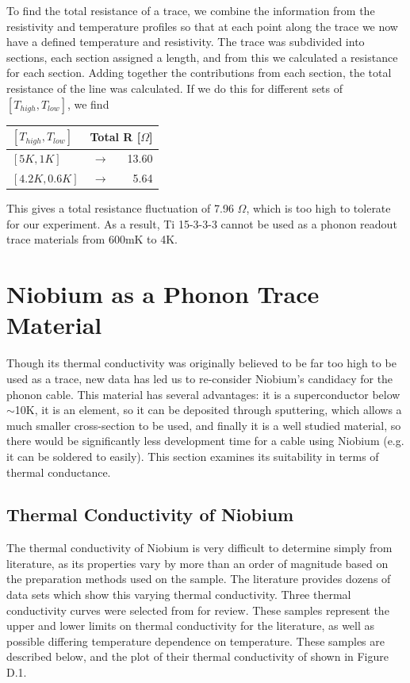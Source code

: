 \documentclass{report}
\begin{document}
\begin{appendices}
To find the total resistance of a trace, we combine the information from the resistivity and temperature profiles so that at each point along the trace we now have a defined temperature and resistivity. The trace was subdivided into sections, each section assigned a length, and from this we calculated a resistance for each section. Adding together the contributions from each section, the total resistance of the line was calculated. If we do this for different sets of $[T_{high},T_{low}]$, we find

\begin{table}[h]
\centering
\begin{threeparttable}
\begin{tabular}{lcr}
\toprule
$[T_{high},T_{low}]$ & \multicolumn{2}{r}{Total R [$\Omega$]} \\
\midrule
$[5K,1K]$ & $\rightarrow$ & 13.60 \\
$[4.2K,0.6K]$ & $\rightarrow$ & 5.64 \\
\bottomrule
\end{tabular}
\end{threeparttable}
\end{table}

This gives a total resistance fluctuation of 7.96 $\Omega$, which is too high to tolerate for our experiment. As a result, Ti 15-3-3-3 cannot be used as a phonon readout trace materials from 600mK to 4K.

\chapter{Niobium as a Phonon Trace Material}

Though its thermal conductivity was originally believed to be far too high to be used as a trace, new data has led us to re-consider Niobium's candidacy for the phonon cable. This material has several advantages: it is a superconductor below $\sim$10K, it is an element, so it can be deposited through sputtering, which allows a much smaller cross-section to be used, and finally it is a well studied material, so there would be significantly less development time for a cable using Niobium (e.g. it can be soldered to easily). This section examines its suitability in terms of thermal conductance.

\section{Thermal Conductivity of Niobium}
The thermal conductivity of Niobium is very difficult to determine simply from literature, as its properties vary by more than an order of magnitude based on the preparation methods used on the sample. The literature provides dozens of data sets which show this varying thermal conductivity. Three thermal conductivity curves were selected from \cite{tou} for review. These samples represent the upper and lower limits on thermal conductivity for the literature, as well as possible differing temperature dependence on temperature. These samples are described below, and the plot of their thermal conductivity of shown in Figure D.1.


\end{appendices}
\end{document}
